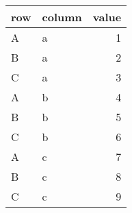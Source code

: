 \begin{tabular}{llr}
  \toprule
 row & column & value \\ 
  \midrule
  A & a &   1 \\ 
  B & a &   2 \\ 
  C & a &   3 \\ 
  A & b &   4 \\ 
  B & b &   5 \\ 
  C & b &   6 \\ 
  A & c &   7 \\ 
  B & c &   8 \\ 
  C & c &   9 \\ 
   \bottomrule
\end{tabular}

